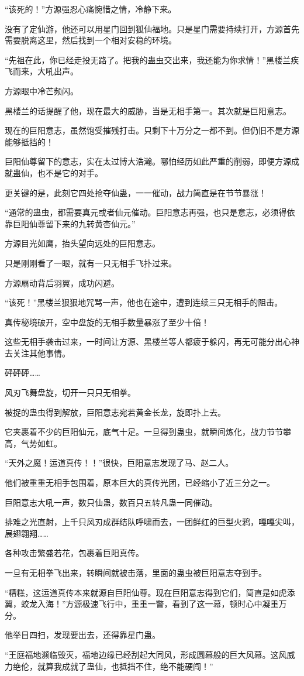 \begin{this_body}
“该死的！”方源强忍心痛惋惜之情，冷静下来。

没有了定仙游，他还可以用星门回到狐仙福地。只是星门需要持续打开，方源首先需要脱离这里，然后找到一个相对安稳的环境。

“先祖在此，你已经走投无路了。把我的蛊虫交出来，我还能为你求情！”黑楼兰疾飞而来，大吼出声。

方源眼中冷芒频闪。

黑楼兰的话提醒了他，现在最大的威胁，当是无相手第一。其次就是巨阳意志。

现在的巨阳意志，虽然饱受摧残打击。只剩下十万分之一都不到。但仍旧不是方源能够抵挡的！

巨阳仙尊留下的意志，实在太过博大浩瀚。哪怕经历如此严重的削弱，即便方源成就蛊仙，也不是它的对手。

更关键的是，此刻它四处抢夺仙蛊，一一催动，战力简直是在节节暴涨！

“通常的蛊虫，都需要真元或者仙元催动。巨阳意志再强，也只是意志，必须得依靠巨阳仙尊留下来的九转黄杏仙元。”

方源目光如鹰，抬头望向远处的巨阳意志。

只是刚刚看了一眼，就有一只无相手飞扑过来。

方源扇动背后羽翼，成功闪避。

“该死！”黑楼兰狠狠地咒骂一声，他也在途中，遭到连续三只无相手的阻击。

真传秘境破开，空中盘旋的无相手数量暴涨了至少十倍！

这些无相手袭击过来，一时间让方源、黑楼兰等人都疲于躲闪，再无可能分出心神去关注其他事情。

砰砰砰……

风刃飞舞盘旋，切开一只只无相拳。

被捉的蛊虫得到解放，巨阳意志宛若黄金长龙，旋即扑上去。

它夹裹着不少的巨阳仙元，底气十足。一旦得到蛊虫，就瞬间炼化，战力节节攀高，气势如虹。

“天外之魔！运道真传！！”很快，巨阳意志发现了马、赵二人。

他们被重重无相手包围着，原本巨大的真传光团，已经缩小了近三分之一。

巨阳意志大吼一声，数只仙蛊，数百只五转凡蛊一同催动。

排难之光直射，上千只风刃成群结队呼啸而去，一团鲜红的巨型火鸦，嘎嘎尖叫，展翅翱翔……

各种攻击繁盛若花，包裹着巨阳真传。

一旦有无相拳飞出来，转瞬间就被击落，里面的蛊虫被巨阳意志夺到手。

“糟糕，这运道真传本来就源自巨阳仙尊。现在巨阳意志得到它们，简直是如虎添翼，蛟龙入海！”方源极速飞行中，重重一瞥，看到了这一幕，顿时心中凝重万分。

他举目四扫，发现要出去，还得靠星门蛊。

“王庭福地濒临毁灭，福地边缘已经刮起大同风，形成圆幕般的巨大风幕。这风威力绝伦，就算我成就了蛊仙，也抵挡不住，绝不能硬闯！”

\end{this_body}

